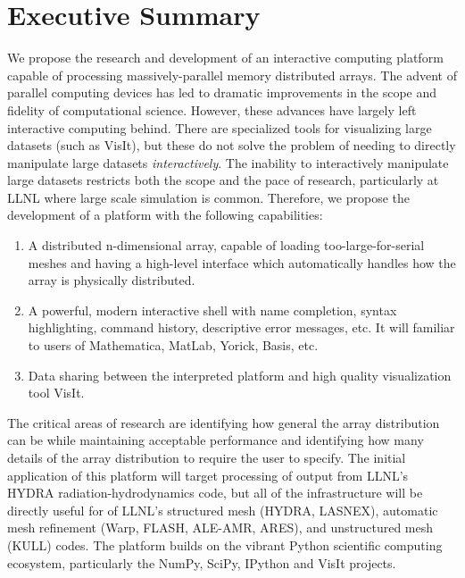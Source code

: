 \documentclass[letterpaper,11pt]{article}
\begin{document}


\setlength{\parindent}{15pt}

\section*{Executive Summary }
We propose the research and development of an interactive computing platform capable of 
processing massively-parallel memory distributed arrays.  The advent of parallel 
computing devices has led to dramatic improvements in the scope and fidelity of 
computational science.  However, these advances have largely left interactive computing 
behind.  There are specialized tools for visualizing large datasets (such as 
VisIt\cite{VisIt}), but these do not solve the problem of needing to directly manipulate 
large datasets \emph{interactively}.  The inability to interactively manipulate large 
datasets restricts both the scope and the pace of research, particularly at LLNL where 
large scale simulation is common.  Therefore, we propose the development of a platform 
with the following capabilities:

\begin{enumerate}
	\item A distributed n-dimensional array, capable of loading too-large-for-serial meshes 
          and having a high-level interface which automatically handles how 
          the array is physically distributed.

	\item A powerful, modern interactive shell with name completion, syntax highlighting, 
		command history, descriptive error messages, etc.  It will familiar to users of 
		Mathematica, MatLab, Yorick, Basis, etc.

	\item Data sharing between the interpreted platform and high quality visualization tool VisIt.
\end{enumerate}

The critical areas of research are identifying how general the array distribution can be 
while maintaining acceptable performance and identifying how many details of the array 
distribution to require the user to specify.  The initial application of this platform 
will target processing of output from LLNL's HYDRA\cite{Marinak2001} radiation-hydrodynamics 
code, but all of the infrastructure will be directly useful for of LLNL's structured mesh 
(HYDRA, LASNEX\cite{Zimmerman1977}), automatic mesh refinement
(Warp\cite{Grote2005}, FLASH\cite{flash}, ALE-AMR\cite{Koniges2010}, ARES),
and unstructured mesh (KULL\cite{Rathkopf2000}) codes.  The platform builds on the vibrant
Python scientific computing ecosystem, particularly the NumPy\cite{Oliphant2006}, 
SciPy\cite{numpyscipy}, IPython\cite{ipython} and VisIt projects.
\end{document}
